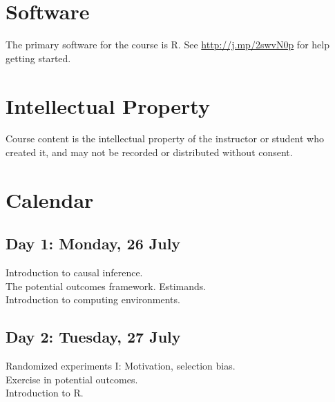 \documentclass[11pt]{article}
\newcommand{\bibverse}[1]{\begin{verse} \bibentry{#1}. \end{verse}}
\begin{document}
\section*{Software}

The primary software for the course is R.  See \href{http://www.ryantmoore.org/files/class/introPolResearch/intro_R_short.pdf}{http://j.mp/2swvN0p}
for help getting started.

\section*{Intellectual Property}
Course content is the intellectual property of the instructor or student who created it, and may not be recorded or distributed without consent.




\section*{Calendar}
\renewcommand{\labelitemi}{$\square$}

\subsection*{Day 1: Monday, 26 July}

	Introduction to causal inference.\\
	The potential outcomes framework.  Estimands.\\
	Introduction to computing environments. 


\subsection*{Day 2: Tuesday, 27 July}

Randomized experiments I: Motivation, selection bias.\\
Exercise in potential outcomes.\\
Introduction to R.\\


\end{document}
